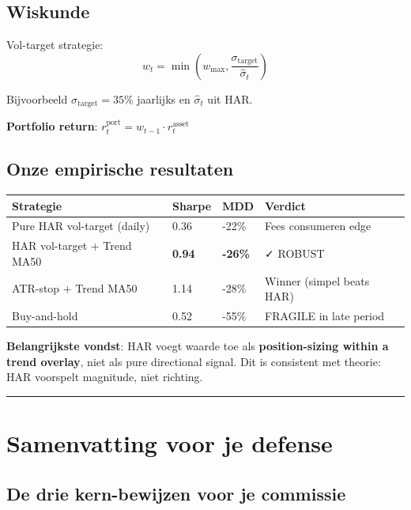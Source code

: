 \documentclass[11pt,a4paper]{article}
\begin{document}
\hypertarget{wiskunde-5}{%
\subsection{Wiskunde}\label{wiskunde-5}}

Vol-target strategie:
\[w_t = \min\left(w_{\max}, \frac{\sigma_{\text{target}}}{\hat\sigma_t}\right)\]

Bijvoorbeeld \(\sigma_{\text{target}} = 35\%\) jaarlijks en \(\hat\sigma_t\) uit HAR.

\textbf{Portfolio return}: \(r_t^{\text{port}} = w_{t-1} \cdot r_t^{\text{asset}}\)

\hypertarget{onze-empirische-resultaten}{%
\subsection{Onze empirische resultaten}\label{onze-empirische-resultaten}}

\begin{longtable}[]{@{}llll@{}}
\toprule
Strategie & Sharpe & MDD & Verdict \\
\midrule
\endhead
Pure HAR vol-target (daily) & 0.36 & -22\% & Fees consumeren edge \\
HAR vol-target + Trend MA50 & \textbf{0.94} & \textbf{-26\%} & ✓ ROBUST \\
ATR-stop + Trend MA50 & 1.14 & -28\% & Winner (simpel beats HAR) \\
Buy-and-hold & 0.52 & -55\% & FRAGILE in late period \\
\bottomrule
\end{longtable}

\textbf{Belangrijkste vondst}: HAR voegt waarde toe als \textbf{position-sizing within a trend overlay}, niet als pure directional signal. Dit is consistent met theorie: HAR voorspelt magnitude, niet richting.

\begin{center}\rule{0.5\linewidth}{0.5pt}\end{center}

\hypertarget{samenvatting-voor-je-defense}{%
\section{Samenvatting voor je defense}\label{samenvatting-voor-je-defense}}

\hypertarget{de-drie-kern-bewijzen-voor-je-commissie}{%
\subsection{De drie kern-bewijzen voor je commissie}\label{de-drie-kern-bewijzen-voor-je-commissie}}
\end{document}
